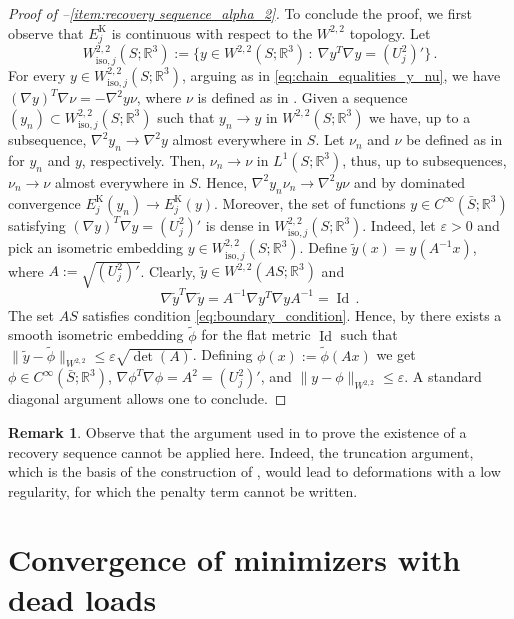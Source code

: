 \documentclass{article}
\theoremstyle{plain}
\theoremstyle{plain}
\theoremstyle{plain}
\theoremstyle{plain}
\theoremstyle{plain}
\theoremstyle{definition}
\newtheorem{remark}[teo]{Remark}
\theoremstyle{definition}
\renewcommand{\r}{\mathbb{R}}
\DeclareMathOperator{\Id}{Id}
\DeclareMathOperator{\KL}{K}
\begin{document}
\begin{proof}[Proof of --\ref{item:recovery sequence_alpha_2}]
    To conclude the proof, we first observe that $E_j^{\KL}$ is continuous with respect to the $W^{2, 2}$ topology.
    Let
    \[
        W^{2,2}_{\text{iso}, j}(S; \r^3) := \{y \in W^{2,2}(S; \r^3) \, : \ \nabla y^T \nabla y = (U^2_j)'\} \,.
    \]
    For every $y \in W^{2, 2}_{\text{iso}, j}(S; \r^3)$, arguing as in \eqref{eq:chain_equalities_y_nu}, we have $(\nabla y)^T \nabla \nu = - \nabla^2 y \nu$, where $\nu$ is defined as in . Given a sequence $(y_n) \subset W^{2, 2}_{\text{iso}, j}(S; \r^3)$ such that $y_n \to y$ in $W^{2, 2}(S; \r^3)$ we have, up to a subsequence, $\nabla^2 y_n \to \nabla^2 y$ almost everywhere in $S$. Let $\nu_n$ and $\nu$ be defined as in  for $y_n$ and $y$, respectively. Then, $\nu_n \to \nu$ in $L^1(S; \r^3)$, thus, up to subsequences, $\nu_n \to \nu$ almost everywhere in $S$. Hence, $\nabla^2y_n \nu_n \to \nabla^2 y \nu$ and by dominated convergence $E_j^{\KL}(y_n) \to E_j^{\KL}(y)$. Moreover, the set of functions $y \in C^{\infty}(\bar S; \r^3)$ satisfying $(\nabla y)^T \nabla y = (U_j^2)'$ is dense in $W^{2, 2}_{\text{iso}, j}(S; \r^3)$. Indeed, let $\varepsilon > 0$ and pick an isometric embedding $y \in W^{2,2}_{\text{iso}, j}(S; \r^3)$. Define $\tilde y(x) = y(A^{-1}x)$, where $A := \sqrt{(U^2_j)'}$. Clearly, $\tilde y \in W^{2,2}(AS; \r^3)$ and
    \[
        \nabla \tilde y^T \nabla \tilde y = A^{-1} \nabla y^T \nabla y A^{-1} = \Id \,.
    \]
    The set $AS$ satisfies condition \eqref{eq:boundary_condition}. Hence, by \cite[Theorem 1]{HORNUNG2011} there exists a smooth isometric embedding $\tilde \phi$ for the flat metric $\Id$ such that $\|\tilde y - \tilde \phi\|_{W^{2,2}} \leq \varepsilon\sqrt{\det(A)}$. Defining $\phi(x) := \tilde \phi(Ax)$ we get $\phi \in C^{\infty}(\bar S; \r^3)$, $\nabla \phi^T \nabla \phi = A^2 = (U_j^2)'$, and $\|y - \phi\|_{W^{2,2}} \leq \varepsilon$. A standard diagonal argument allows one to conclude.
\end{proof}

\begin{remark}
    Observe that the argument used in \cite{FRIESECKE2002} to prove the existence of a recovery sequence cannot be applied here. Indeed, the truncation argument, which is the basis of the construction of \cite{FRIESECKE2002}, would lead to deformations with a low regularity, for which the penalty term cannot be written.
\end{remark}


\section{Convergence of minimizers with dead loads}\label{section:forces}
\end{document}
